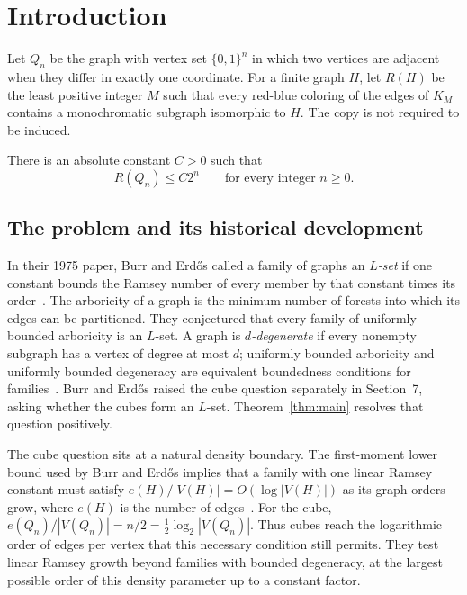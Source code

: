 \section{Introduction}
\label{sec:introduction}

Let $Q_n$ be the graph with vertex set $\{0,1\}^n$ in which two vertices
are adjacent when they differ in exactly one coordinate. For a finite graph
$H$, let $R(H)$ be the least positive integer $M$ such that every red-blue
coloring of the edges of $K_M$ contains a monochromatic subgraph isomorphic
to $H$. The copy is not required to be induced.

\begin{theorem}\label{thm:main}
There is an absolute constant $C>0$ such that
\[
R(Q_n)\le C2^n
\qquad\text{for every integer }n\ge0.
\]
\end{theorem}

\subsection{The problem and its historical development}

In their 1975 paper, Burr and Erd\H{o}s called a family of graphs an
\emph{$L$-set} if one constant bounds the Ramsey number of every member
by that constant times its order~\cite[Section~1]{burr-erdos1975}.
The arboricity of a graph is the minimum number of forests into which its
edges can be partitioned. They conjectured that every family of uniformly
bounded arboricity is an $L$-set. A graph is \emph{$d$-degenerate} if every nonempty subgraph
has a vertex of degree at most $d$; uniformly bounded arboricity and
uniformly bounded degeneracy are equivalent boundedness conditions for
families~\cite[Section~3]{burr-erdos1975}. Burr and Erd\H{o}s raised the
cube question separately in Section~7, asking whether the cubes form an
$L$-set. Theorem~\ref{thm:main} resolves that question positively.

The cube question sits at a natural density boundary. The first-moment
lower bound used by Burr and Erd\H{o}s implies that a family with one linear
Ramsey constant must satisfy
$e(H)/|V(H)|=O(\log |V(H)|)$ as its graph orders grow, where $e(H)$ is
the number of edges~\cite[Lemma~4.3 and Section~7]{burr-erdos1975}.
For the cube,
$e(Q_n)/|V(Q_n)|=n/2=\tfrac12\log_2|V(Q_n)|$.
Thus cubes reach the logarithmic order of edges per vertex that this
necessary condition still permits. They test linear Ramsey growth beyond
families with bounded degeneracy, at the largest possible order of this
density parameter up to a constant factor.

